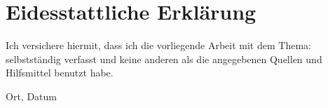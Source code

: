 \section*{Eidesstattliche Erklärung}

	Ich versichere hiermit, dass ich die vorliegende Arbeit mit dem Thema: \textit{\varTitle} selbstständig verfasst und keine anderen als die angegebenen Quellen und Hilfsmittel benutzt habe.

	\vspace{3cm}
	Ort, Datum \hspace{11cm} \varName
